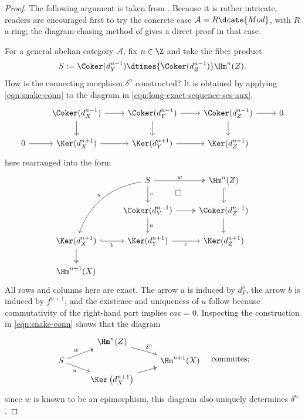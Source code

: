 \begin{proof}
	The following argument is taken from \cite[Proposition~12.3.6]{KS06}.
	Because it is rather intricate, readers are encouraged first to try the
	concrete case $\mathcal{A}=R\dcate{Mod}$, with $R$ a ring; the
	diagram-chasing method of \cite[\S 6.8]{Li1} gives a direct proof in that
	case.

	For a general abelian category $\mathcal{A}$, fix $n\in\Z$ and take the
	fiber product
	\[ S := \Coker(d_Y^{n-1}) \dtimes{\Coker(d_Z^{n-1})} \Hm^n(Z). \]
	How is the connecting morphism $\delta^n$ constructed? It is obtained by
	applying \eqref{eqn:snake-conn} to the diagram in
	\eqref{eqn:long-exact-sequence-ses-aux},
	\[\begin{tikzcd}
		& \Coker(d_X^{n-1}) \arrow[r] \arrow[d] & \Coker(d_Y^{n-1}) \arrow[r] \arrow[d] & \Coker(d_Z^{n-1}) \arrow[d] \arrow[r] & 0 \\
		0 \arrow[r] & \Ker(d_X^{n+1}) \arrow[r] & \Ker(d_Y^{n+1}) \arrow[r] & \Ker(d_Z^{n+1}) &
	\end{tikzcd}\]
	here rearranged into the form
	\begin{equation}\label{eqn:connecting-eta-delta-0}\begin{tikzcd}
		& S \arrow[twoheadrightarrow, r, "w"] \arrow[d, "v"] \arrow[ldd, bend right, "u"'] \arrow[rd, phantom, "\Box" description] & \Hm^n(Z) \arrow[hookrightarrow, d] \\
		& \Coker(d_Y^{n-1}) \arrow[twoheadrightarrow, r] \arrow[d, "a"] & \Coker(d_Z^{n-1}) \arrow[d] \\
		\Ker(d_X^{n+1}) \arrow[hookrightarrow, r, "b"'] \arrow[twoheadrightarrow, d] & \Ker(d_Y^{n+1}) \arrow[r, "c"'] & \Ker(d_Z^{n+1}) \\
		\Hm^{n+1}(X) & &
	\end{tikzcd}\end{equation}
	All rows and columns here are exact. The arrow $a$ is induced by $d_Y^n$,
	the arrow $b$ is induced by $f^{n+1}$, and the existence and uniqueness of
	$u$ follow because commutativity of the right-hand part implies $cav=0$.
	Inspecting the construction in \eqref{eqn:snake-conn} shows that the
	diagram
	\begin{equation}\label{eqn:connecting-eta-delta-0.5}\begin{tikzcd}[row sep=tiny]
		& \Hm^n(Z) \arrow[rd, "\delta^n"] & \\
		S \arrow[twoheadrightarrow, ru, "w"] \arrow[rd, "u"'] & & \Hm^{n+1}(X) \\
		& \Ker\left( d_X^{n+1} \right) \arrow[twoheadrightarrow, ru] &
	\end{tikzcd} \quad \text{commutes}; \end{equation}
	since $w$ is known to be an epimorphism, this diagram also uniquely
	determines $\delta^n$.


\end{proof}
